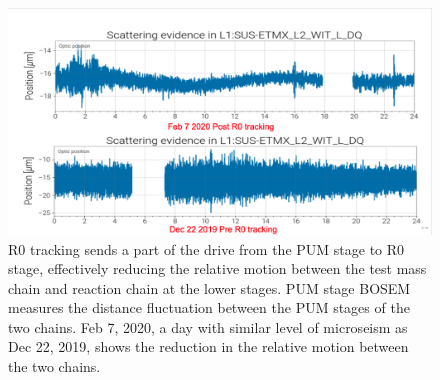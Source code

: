 \documentclass[12pt]{iopart}
\begin{document}
\begin{figure}[h]
    \centering
    \includegraphics[width=12cm]{feb7_dec22l2.png}
    \caption{R0 tracking sends a part of the drive from the PUM stage to R0 stage, effectively reducing the relative motion between the test mass chain and reaction chain at the lower stages. PUM stage BOSEM measures the distance fluctuation between the PUM stages of the two chains. Feb 7, 2020, a day with similar level of microseism as Dec 22, 2019, shows the  reduction in the relative motion between the two chains.}
    \label{fig:l2_comparison}
\end{figure}
\end{document}
